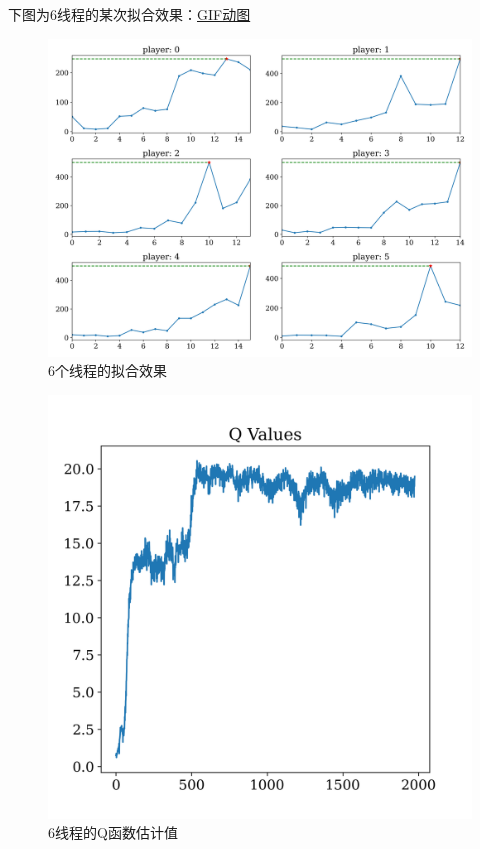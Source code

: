 \documentclass[12pt, a4paper, oneside]{ctexart}
\numberwithin{equation}{section}  %
\begin{document}
下图为6线程的某次拟合效果：\href{https://imgloc.com/i/iSx9U5}{GIF动图}
\begin{figure}[H]
    \hspace{-1.3cm}
    \includegraphics[scale=0.6]{figures/Cartpole/multi_process/player_logs.png}
    \caption{6个线程的拟合效果}
\end{figure}
\begin{figure}[htbp]
    \centering
    \includegraphics[scale=0.6]{figures/Cartpole/multi_process/Q_values.png}
    \caption{6线程的Q函数估计值}
\end{figure}
\end{document}
